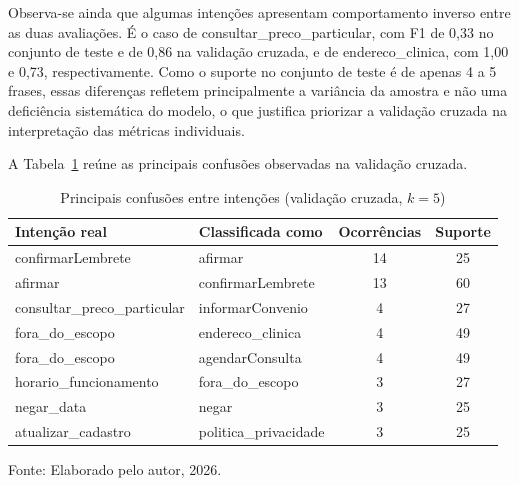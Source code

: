 \documentclass[12pt,a4paper]{extarticle}
\begin{document}
Observa-se ainda que algumas intenções apresentam comportamento inverso entre as duas avaliações. É o caso de consultar\_\allowbreak{}preco\_\allowbreak{}particular, com F1 de 0,33 no conjunto de teste e de 0,86 na validação cruzada, e de endereco\_\allowbreak{}clinica, com 1,00 e 0,73, respectivamente. Como o suporte no conjunto de teste é de apenas 4 a 5 frases, essas diferenças refletem principalmente a variância da amostra e não uma deficiência sistemática do modelo, o que justifica priorizar a validação cruzada na interpretação das métricas individuais.

A Tabela~\ref{tab:confusoes} reúne as principais confusões observadas na validação cruzada.

\begin{table}[H]
\centering
\caption{Principais confusões entre intenções (validação cruzada, $k=5$)}
\label{tab:confusoes}
\begin{tabular}{p{4.4cm}p{4.4cm}cc}
\hline
\textbf{Intenção real} & \textbf{Classificada como} & \textbf{Ocorrências} & \textbf{Suporte} \\
\hline
confirmarLembrete & afirmar & 14 & 25 \\
afirmar & confirmarLembrete & 13 & 60 \\
consultar\_\allowbreak{}preco\_\allowbreak{}particular & informarConvenio & 4 & 27 \\
fora\_\allowbreak{}do\_\allowbreak{}escopo & endereco\_\allowbreak{}clinica & 4 & 49 \\
fora\_\allowbreak{}do\_\allowbreak{}escopo & agendarConsulta & 4 & 49 \\
horario\_\allowbreak{}funcionamento & fora\_\allowbreak{}do\_\allowbreak{}escopo & 3 & 27 \\
negar\_\allowbreak{}data & negar & 3 & 25 \\
atualizar\_\allowbreak{}cadastro & politica\_\allowbreak{}privacidade & 3 & 25 \\
\hline
\end{tabular}
\vspace{0.3cm}

\footnotesize{Fonte: Elaborado pelo autor, 2026.}
\end{table}
\end{document}
